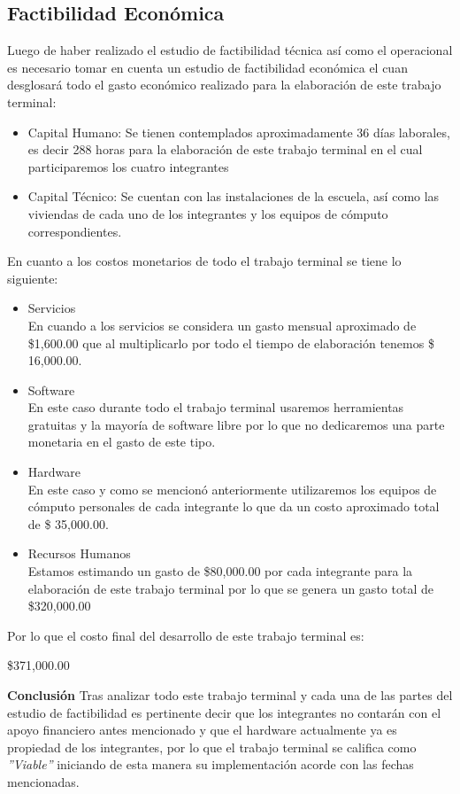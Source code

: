 \documentclass[12pt, a4paper, titlepage]{report}
\begin{document}
    	    \subsection{Factibilidad Económica}
    	    Luego de haber realizado el estudio de factibilidad técnica así como el operacional es necesario tomar en cuenta un estudio de factibilidad económica el cuan desglosará todo el gasto económico realizado para la elaboración de este trabajo terminal:
    	    \begin{itemize}
    	        \item Capital Humano: Se tienen contemplados aproximadamente 36 días laborales, es decir 288 horas para la elaboración de este trabajo terminal en el cual participaremos los cuatro integrantes
    	        \item Capital Técnico: Se cuentan con las instalaciones de la escuela, así como las viviendas de cada uno de los integrantes y los equipos de cómputo correspondientes.
    	    \end{itemize}
    	    En cuanto a los costos monetarios de todo el trabajo terminal se tiene lo siguiente:
    	    \begin{itemize}
    	        \item Servicios\\
    	        En cuando a los servicios se considera un gasto mensual aproximado de \$1,600.00 que al multiplicarlo por todo el tiempo de elaboración tenemos \$ 16,000.00.
    	        \item Software \\
    	        En este caso durante todo el trabajo terminal usaremos herramientas gratuitas y la mayoría de software libre por lo que no dedicaremos una parte monetaria en el gasto de este tipo.
    	        \item Hardware\\
    	        En este caso y como se mencionó anteriormente utilizaremos los equipos de cómputo personales de cada integrante lo que da un costo aproximado total de \$ 35,000.00.
    	        \item Recursos Humanos\\
    	        Estamos estimando un gasto de \$80,000.00 por cada integrante para la elaboración de este trabajo terminal por lo que se genera un gasto total de \$320,000.00
    	    \end{itemize}
    	    Por lo que el costo final del desarrollo de este trabajo terminal es: \\
    	    \begin{center}
    	        \$371,000.00
    	    \end{center}
    	    \textbf{Conclusión} Tras analizar todo este trabajo terminal y cada una de las partes del estudio de factibilidad es pertinente decir que los integrantes no contarán con el apoyo financiero antes mencionado y que el hardware actualmente ya es propiedad de los integrantes, por lo que el trabajo terminal se califica como \textit{''Viable''} iniciando de esta manera su implementación acorde con las fechas mencionadas.
    	    
\end{document}
